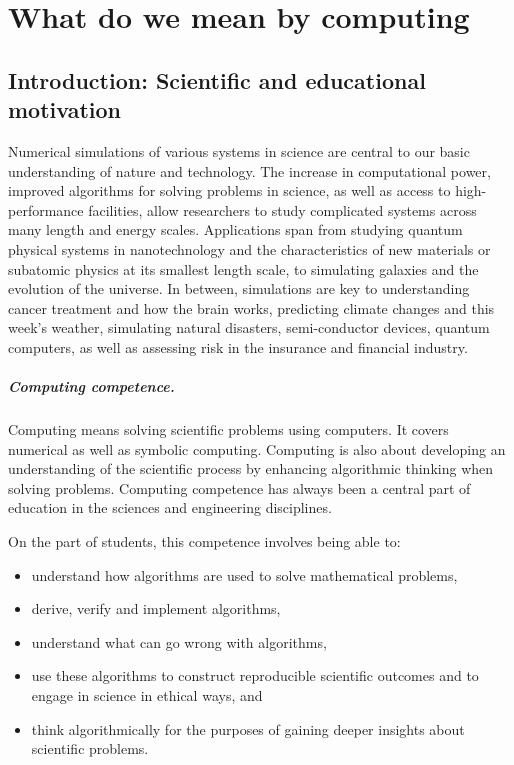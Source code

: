 \chapter{What do we mean by computing}
\section*{Introduction: Scientific and educational motivation}

Numerical simulations of various systems in science are central to our
basic understanding of nature and technology.
The increase in computational power,
improved algorithms for solving problems in science, as well as access
to high-performance facilities, allow researchers to study
complicated systems across many length and energy scales. Applications
span from studying quantum physical systems in nanotechnology and the
characteristics of new materials or subatomic physics at its smallest
length scale, to simulating galaxies and the evolution of the universe.
In between, simulations are key to understanding
cancer treatment and how the brain works,
predicting climate changes and this week's weather,
simulating natural disasters, semi-conductor devices,
quantum computers, as well as assessing risk in the insurance and
financial industry.


\paragraph{Computing competence.}
Computing means solving scientific problems using computers. It covers
numerical as well as symbolic computing. Computing is also about
developing an understanding of the scientific process by enhancing
algorithmic thinking when solving problems.  Computing competence has
always been a central part of education in the sciences and engineering disciplines.

On the part of students, this competence involves being able to:

\begin{itemize}
\item understand how algorithms are used to solve mathematical problems,

\item derive, verify and implement algorithms,

\item understand what can go wrong with algorithms,

\item use these algorithms to construct reproducible scientific outcomes and to engage in science in ethical ways, and

\item think algorithmically for the purposes of gaining deeper insights about scientific problems.
\end{itemize}

